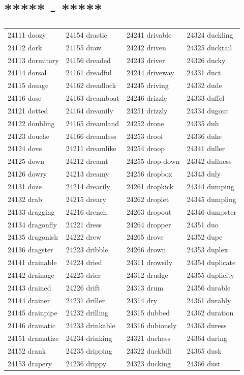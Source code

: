 \documentclass[10pt, oneside]{book}
\begin{document}
\begin{table}
	\centering
	\section*{***** - *****}
	\begin{tabular}{l l l l}
24111 doozy &24154 drastic &24241 drivable &24324 duckling\\
24112 dork &24155 draw &24242 driven &24325 ducktail\\
24113 dormitory &24156 dreaded &24243 driver &24326 ducky\\
24114 dorsal &24161 dreadful &24244 driveway &24331 duct\\
24115 dosage &24162 dreadlock &24245 driving &24332 dude\\
24116 dose &24163 dreamboat &24246 drizzle &24333 duffel\\
24121 dotted &24164 dreamily &24251 drizzly &24334 dugout\\
24122 doubling &24165 dreamland &24252 drone &24335 duh\\
24123 douche &24166 dreamless &24253 drool &24336 duke\\
24124 dove &24211 dreamlike &24254 droop &24341 duller\\
24125 down &24212 dreamt &24255 drop-down &24342 dullness\\
24126 dowry &24213 dreamy &24256 dropbox &24343 duly\\
24131 doze &24214 drearily &24261 dropkick &24344 dumping\\
24132 drab &24215 dreary &24262 droplet &24345 dumpling\\
24133 dragging &24216 drench &24263 dropout &24346 dumpster\\
24134 dragonfly &24221 dress &24264 dropper &24351 duo\\
24135 dragonish &24222 drew &24265 drove &24352 dupe\\
24136 dragster &24223 dribble &24266 drown &24353 duplex\\
24141 drainable &24224 dried &24311 drowsily &24354 duplicate\\
24142 drainage &24225 drier &24312 drudge &24355 duplicity\\
24143 drained &24226 drift &24313 drum &24356 durable\\
24144 drainer &24231 driller &24314 dry &24361 durably\\
24145 drainpipe &24232 drilling &24315 dubbed &24362 duration\\
24146 dramatic &24233 drinkable &24316 dubiously &24363 duress\\
24151 dramatize &24234 drinking &24321 duchess &24364 during\\
24152 drank &24235 dripping &24322 duckbill &24365 dusk\\
24153 drapery &24236 drippy &24323 ducking &24366 dust\\
	\end{tabular}
 \end{table}
\end{document}
